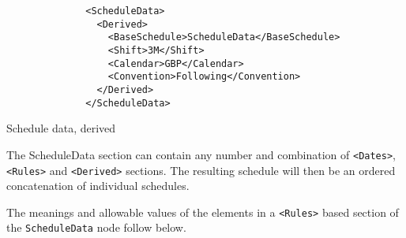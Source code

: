 \begin{listing}[H]
\begin{verbatim}
              <ScheduleData>
                <Derived>
                  <BaseSchedule>ScheduleData</BaseSchedule>
                  <Shift>3M</Shift>
                  <Calendar>GBP</Calendar>
                  <Convention>Following</Convention>
                </Derived> 
              </ScheduleData>
\end{verbatim}
\caption{Schedule data, derived}
\label{lst:schedule_data_derived}
\end{listing}

The ScheduleData section can contain any number and combination of
{\tt <Dates>}, {\tt <Rules>} and {\tt <Derived>} sections. The resulting schedule will
then be an ordered concatenation of individual schedules.
 
\medskip
The meanings and allowable values of the elements in a {\tt <Rules>} based section of the \lstinline!ScheduleData! node follow below.

